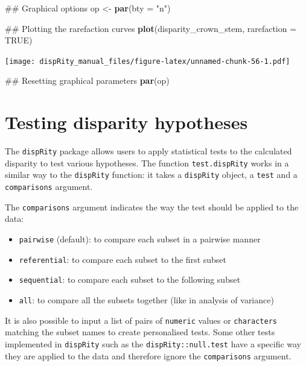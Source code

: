 \documentclass[]{book}
\newenvironment{Shaded}{\begin{snugshade}}{\end{snugshade}}
\newcommand{\KeywordTok}[1]{\textcolor[rgb]{0.13,0.29,0.53}{\textbf{#1}}}
\newcommand{\DataTypeTok}[1]{\textcolor[rgb]{0.13,0.29,0.53}{#1}}
\newcommand{\StringTok}[1]{\textcolor[rgb]{0.31,0.60,0.02}{#1}}
\newcommand{\OtherTok}[1]{\textcolor[rgb]{0.56,0.35,0.01}{#1}}
\newcommand{\NormalTok}[1]{#1}
\providecommand{\tightlist}{%
  \setlength{\itemsep}{0pt}\setlength{\parskip}{0pt}}
\theoremstyle{definition}
\theoremstyle{definition}
\theoremstyle{remark}
\begin{document}
\begin{Shaded}
\begin{Highlighting}[]
\NormalTok{## Graphical options}
\NormalTok{op <-}\StringTok{ }\KeywordTok{par}\NormalTok{(}\DataTypeTok{bty =} \StringTok{"n"}\NormalTok{)}

\NormalTok{## Plotting the rarefaction curves}
\KeywordTok{plot}\NormalTok{(disparity_crown_stem, }\DataTypeTok{rarefaction =} \OtherTok{TRUE}\NormalTok{)}
\end{Highlighting}
\end{Shaded}

\texttt{[image: dispRity\_manual\_files/figure-latex/unnamed-chunk-56-1.pdf]}

\begin{Shaded}
\begin{Highlighting}[]
\NormalTok{## Resetting graphical parameters}
\KeywordTok{par}\NormalTok{(op)}
\end{Highlighting}
\end{Shaded}

\section{Testing disparity
hypotheses}\label{testing-disparity-hypotheses}

The \texttt{dispRity} package allows users to apply statistical tests to
the calculated disparity to test various hypotheses. The function
\texttt{test.dispRity} works in a similar way to the \texttt{dispRity}
function: it takes a \texttt{dispRity} object, a \texttt{test} and a
\texttt{comparisons} argument.

The \texttt{comparisons} argument indicates the way the test should be
applied to the data:

\begin{itemize}
\tightlist
\item
  \texttt{pairwise} (default): to compare each subset in a pairwise
  manner
\item
  \texttt{referential}: to compare each subset to the first subset
\item
  \texttt{sequential}: to compare each subset to the following subset
\item
  \texttt{all}: to compare all the subsets together (like in analysis of
  variance)
\end{itemize}

It is also possible to input a list of pairs of \texttt{numeric} values
or \texttt{characters} matching the subset names to create personalised
tests. Some other tests implemented in \texttt{dispRity} such as the
\texttt{dispRity::null.test} have a specific way they are applied to the
data and therefore ignore the \texttt{comparisons} argument.
\end{document}
